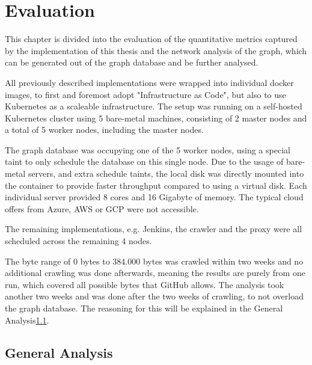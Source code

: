 \chapter{Evaluation}

This chapter is divided into the evaluation of the quantitative metrics captured by the implementation of this thesis and the network analysis of the graph, which can be generated out of the graph database and be further analysed.

All previously described implementations were wrapped into individual docker images, to first and foremost adopt "Infrastructure as Code", but also to use Kubernetes as a scaleable infrastructure. The setup was running on a self-hosted Kubernetes cluster using 5 bare-metal machines, consisting of 2 master nodes and a total of 5 worker nodes, including the master nodes.

The graph database was occupying one of the 5 worker nodes, using a special taint to only schedule the database on this single node. Due to the usage of bare-metal servers, and extra schedule taints, the local disk was directly mounted into the container to provide faster throughput compared to using a virtual disk. Each individual server provided 8 cores and 16 Gigabyte of memory. The typical cloud offers from Azure, AWS or GCP were not accessible.

The remaining implementations, e.g. Jenkins, the crawler and the proxy were all scheduled across the remaining 4 nodes.

The byte range of 0 bytes to 384.000 bytes was crawled within two weeks and no additional crawling was done afterwards, meaning the results are purely from one run, which covered all possible bytes that GitHub allows. The analysis took another two weeks and was done after the two weeks of crawling, to not overload the graph database. The reasoning for this will be explained in the General Analysis\ref{sec:general_analysis}.

\section{General Analysis}
\label{sec:general_analysis}

